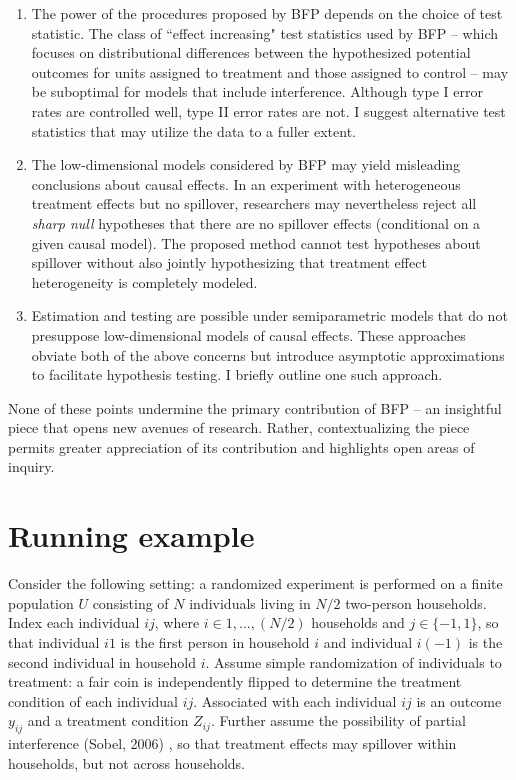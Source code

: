\documentclass[12pt]{article}
\newcommand{\0}{\mathbf{0}}
\begin{document}
\begin{enumerate}
\item The power of the procedures proposed by BFP depends on the choice of test statistic. The class of ``effect increasing" test statistics used by BFP -- which focuses on distributional differences between the hypothesized potential outcomes for units assigned to treatment and those assigned to control -- may be suboptimal for models that include interference. Although type I error rates are controlled well, type II error rates are not. I suggest alternative test statistics that may utilize the data to a fuller extent. 
\item The low-dimensional models considered by BFP may yield misleading conclusions about causal effects. In an experiment with heterogeneous treatment effects but no spillover, researchers may nevertheless reject all {\it sharp null} hypotheses that there are no spillover effects (conditional on a given causal model). The proposed method cannot test hypotheses about spillover without also jointly hypothesizing that treatment effect heterogeneity is completely modeled.
\item Estimation and testing are possible under semiparametric models that do not presuppose low-dimensional models of causal effects. These approaches obviate both of the above concerns but introduce asymptotic approximations to facilitate hypothesis testing. I briefly outline one such approach.%
\end{enumerate}
None of these points undermine the primary contribution of BFP -- an %
insightful piece that opens new avenues of research. Rather, contextualizing the piece permits greater appreciation of its contribution and highlights open areas of inquiry.

\section*{Running example}

Consider the following setting: a randomized experiment is performed on a finite population $U$ consisting of $N$ individuals living in $N/2$ two-person households. Index each individual $ij$, where $i \in 1,...,(N/2)$ households and $j \in \{-1,1\}$, so that individual $i1$ is the first person in household $i$ and individual $i(-1)$ is the second individual in household $i$. Assume simple randomization of individuals to treatment: a fair coin is independently flipped to determine the treatment condition of each individual $ij$. Associated with each individual $ij$ is an outcome $y_{ij}$ and a treatment condition $Z_{ij}$. Further assume the possibility of partial interference (Sobel, 2006)%
, so that treatment effects may spillover within households, but not across households.
\end{document}
